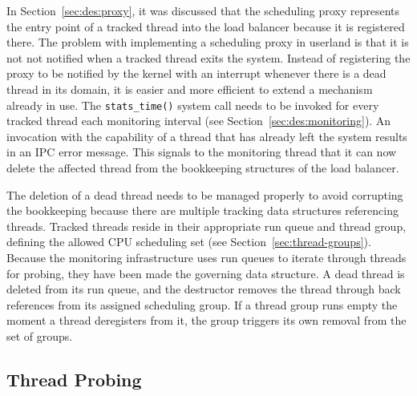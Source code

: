 In Section~\ref{sec:des:proxy}, it was discussed that the scheduling proxy represents the entry point of a tracked thread into the load balancer because it is registered there.
The problem with implementing a scheduling proxy in userland is that it is not not notified when a tracked thread exits the system.
Instead of registering the proxy to be notified by the kernel with an interrupt whenever there is a dead thread in its domain, it is easier and more efficient to extend a mechanism already in use.
The \texttt{stats\_time()} system call needs to be invoked for every tracked thread each monitoring interval (see Section~\ref{sec:des:monitoring}).
An invocation with the capability of a thread that has already left the system results in an IPC error message.
This signals to the monitoring thread that it can now delete the affected thread from the bookkeeping structures of the load balancer.

The deletion of a dead thread needs to be managed properly to avoid corrupting the bookkeeping because there are multiple tracking data structures referencing threads.
Tracked threads reside in their appropriate run queue and thread group, defining the allowed CPU scheduling set (see Section~\ref{sec:thread-groups}).
Because the monitoring infrastructure uses run queues to iterate through threads for probing, they have been made the governing data structure.
A dead thread is deleted from its run queue, and the destructor removes the thread through back references from its assigned scheduling group.
If a thread group runs empty the moment a thread deregisters from it, the group triggers its own removal from the set of groups.

\subsection{Thread Probing}
\label{sec:probing}

